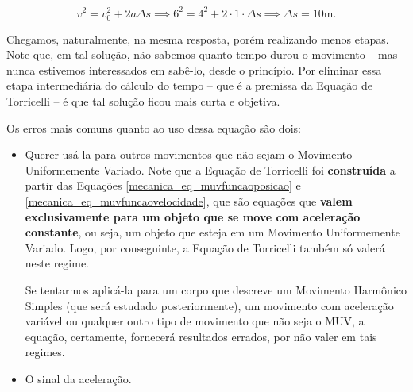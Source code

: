 $$ v^2=v_0^2 + 2a \Delta s \implies 6^2 = 4^2+2 \cdot 1 \cdot \Delta s \implies \boxed{ \Delta s = 10\text{m}.}$$

Chegamos, naturalmente, na mesma resposta, porém realizando menos etapas. Note que, em tal solução, não sabemos quanto tempo durou o movimento -- mas nunca estivemos interessados em sabê-lo, desde o princípio. Por eliminar essa etapa intermediária do cálculo do tempo -- que é a premissa da Equação de Torricelli -- é que tal solução ficou mais curta e objetiva.






Os erros mais comuns quanto ao uso dessa equação são dois:

\begin{itemize}
    \item [(i)] Querer usá-la para outros movimentos que não sejam o Movimento Uniformemente Variado. Note que a Equação de Torricelli foi \textbf{construída} a partir das Equações \eqref{mecanica_eq_muvfuncaoposicao} e \eqref{mecanica_eq_muvfuncaovelocidade}, que são equações que \textbf{valem exclusivamente para um objeto que se move com aceleração constante}, ou seja, um objeto que esteja em um Movimento Uniformemente Variado. Logo, por conseguinte, a Equação de Torricelli também só valerá neste regime. 

    Se tentarmos aplicá-la para um corpo que descreve um Movimento Harmônico Simples (que será estudado posteriormente), um movimento com aceleração variável ou qualquer outro tipo de movimento que não seja o MUV, a equação, certamente, fornecerá resultados errados, por não valer em tais regimes.


    \item [(ii)] O sinal da aceleração.






\end{itemize}
